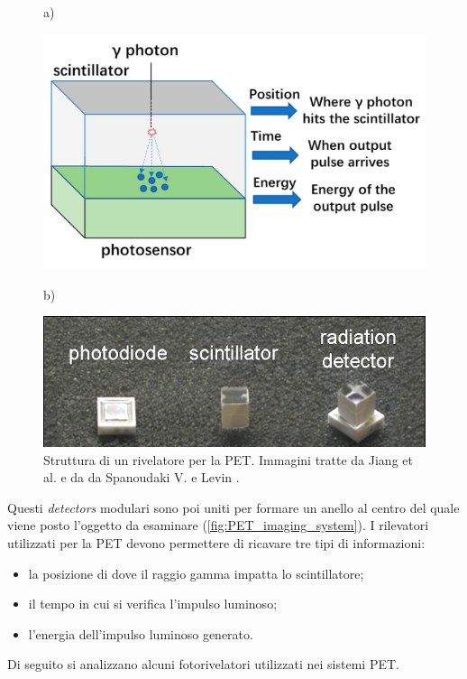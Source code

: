 \begin{figure}[tbh]
	\centering
	a)
	\begin{minipage}{.45\textwidth}
		\includegraphics[width=\linewidth]{./ImageFiles/PET_detectors.jpg}
	\end{minipage}
	b)
	\begin{minipage}{.45\textwidth}
		\includegraphics[width=\linewidth]{./ImageFiles/PET_detectors_real.jpg}
	\end{minipage}
	\caption{Struttura di un rivelatore per la PET. Immagini tratte da Jiang et al. \cite{Jiang2019} e da da Spanoudaki V. e Levin \cite{Spanoudaki2010}.}
	\label{fig:photodetectors}
\end{figure}
Questi \textit{detectors} modulari sono poi uniti per formare un anello al centro del quale viene posto l'oggetto da esaminare (\Fig\ref{fig:PET_imaging_system}). I rilevatori utilizzati per la PET devono permettere di ricavare tre tipi di informazioni:
\begin{itemize}
	\item la posizione di dove il raggio gamma impatta lo scintillatore;
	\item il tempo in cui si verifica l'impulso luminoso;
	\item l'energia dell'impulso luminoso generato.
\end{itemize}
Di seguito si analizzano alcuni fotorivelatori utilizzati nei sistemi PET.

